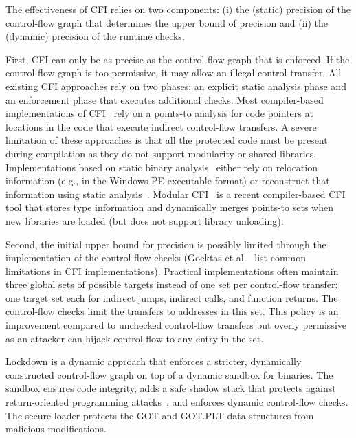 \documentclass{acm_proc_article-sp}
\begin{document}
The effectiveness of CFI relies on two components: (i) the (static) precision of
the control-flow graph that determines the upper bound of precision and (ii) the
(dynamic) precision of the runtime checks. 

First, CFI can only be as precise as the control-flow graph that is enforced. If
the control-flow graph is too permissive, it may allow an illegal control
transfer. All existing CFI approaches rely on two phases: an explicit static
analysis phase and an enforcement phase that executes additional checks. Most
compiler-based implementations of CFI~\cite{ccs05erlingsson, osdi06erlingsson,
bletsch11acsac, wang10oakland, philippaerts11dimva, akritidis08sp, zeng13usenix,
ben13ccs} rely on a points-to analysis for code pointers at locations in the
code that execute indirect control-flow transfers.  A severe limitation of these
approaches is that all the protected code must be present during compilation as
they do not support modularity or shared libraries.  Implementations based on
static binary analysis~\cite{zhang13oakland, davi12ndss, xi12dsn,
zhang13asiaccs} either rely on relocation information (e.g., in the Windows PE
executable format) or reconstruct that information using static
analysis~\cite{zhang13security}. Modular CFI~\cite{niu14pldi} is a recent
compiler-based CFI tool that stores type information and dynamically merges
points-to sets when new libraries are loaded (but does not support library
unloading).

Second, the initial upper bound for precision is possibly limited through the
implementation of the control-flow checks (Goektas et al.~\cite{goektas14sp}
list common limitations in CFI implementations).
Practical implementations often maintain three global sets of possible targets
instead of one set per control-flow transfer: one target set each for indirect
jumps, indirect calls, and function returns. The control-flow checks limit the
transfers to addresses in this set. This policy is an improvement compared to
unchecked control-flow transfers but overly permissive as an attacker can hijack
control-flow to any entry in the set.


Lockdown is a dynamic approach that enforces a stricter, dynamically constructed
control-flow graph on top of a dynamic sandbox for binaries. The sandbox ensures
code integrity, adds a safe shadow stack that protects against return-oriented
programming attacks~\cite{ret2libc}, and enforces dynamic control-flow checks.
The secure loader protects the GOT and GOT.PLT data structures from malicious
modifications.
\end{document}
